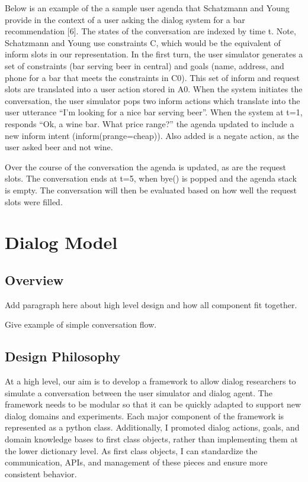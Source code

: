 Below is an  example of the a sample user agenda that Schatzmann and Young provide in the context of a user asking the dialog system for a bar recommendation [6]. The states of the conversation are indexed by time t. Note, Schatzmann and Young use constraints C, which would be the equivalent of inform slots in our representation. In the first turn, the user simulator generates a set of constraints (bar serving beer in central) and goals (name, address, and phone for a bar that meets the constraints in C0). This set of inform and request slots are translated into a user action stored in A0. When the system initiates the conversation, the user simulator pops two inform actions which translate into the user utterance “I’m looking for a nice bar serving beer”. When the system at t=1, responds “Ok, a wine bar. What price range?” the agenda updated to include a new inform intent (inform(prange=cheap)). Also added is a negate action, as the user asked beer and not wine. 

Over the course of the conversation the agenda is updated, as are the request slots. The conversation ends at t=5, when bye() is popped and the agenda stack is empty. The conversation will then be evaluated based on how well the request slots were filled.



\section{Dialog Model}

\subsection{Overview}

Add paragraph here about high level design and how all component fit together. 

Give example of simple conversation flow.


\subsection{Design Philosophy}

At a high level, our aim is to develop a framework to allow dialog researchers to simulate a conversation between the user simulator and dialog agent. The framework needs to be modular so that it can be quickly adapted to support new dialog domains and experiments. Each major component of the framework is represented as a python class. Additionally, I promoted dialog actions, goals, and domain knowledge bases to first class objects, rather than implementing them at the lower dictionary level. As first class objects, I can standardize the communication, APIs, and management of these pieces and ensure more consistent behavior.

